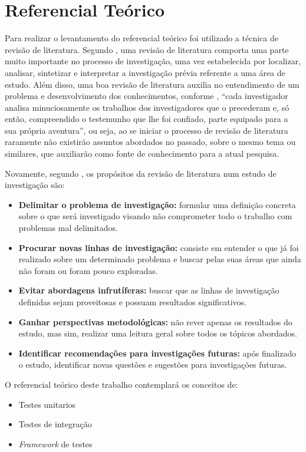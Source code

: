 \chapter{Referencial Teórico}
Para realizar o levantamento do referencial teórico foi utilizado a técnica de revisão de literatura.
Segundo , uma revisão de literatura comporta uma parte muito importante no processo de investigação, 
uma vez estabelecida por localizar, analisar, sintetizar e interpretar a investigação prévia referente a uma área de estudo. 
Além disso, uma boa revisão de literatura auxilia no entendimento de um problema e desenvolvimento dos conhecimentos, 
conforme , “cada investigador analisa minuciosamente os trabalhos dos investigadores 
que o precederam e, só então, compreendido o testemunho que lhe foi confiado, parte equipado para a sua própria aventura”, 
ou seja, ao se iniciar o processo de revisão de literatura raramente não existirão assuntos abordados no passado, sobre o 
mesmo tema ou similares, que auxiliarão como fonte de conhecimento para a atual pesquisa.

Novamente, segundo , os propósitos da revisão de literatura num estudo de investigação são:

\begin{itemize}
 
	\item \textbf{Delimitar o problema de investigação:} formular uma definição concreta sobre o que será investigado visando não comprometer todo o trabalho com problemas mal delimitados.
	\item \textbf{Procurar novas linhas de investigação:} consiste em entender o que já foi realizado sobre um determinado problema e buscar pelas suas áreas que ainda não foram ou foram pouco exploradas.
	\item \textbf{Evitar abordagens infrutíferas:} buscar que as linhas de investigação definidas sejam proveitosas e possuam resultados significativos.
	\item \textbf{Ganhar perspectivas metodológicas:} não rever apenas os resultados do estudo, mas sim, realizar uma leitura geral sobre todos os tópicos abordados.
	\item \textbf{Identificar recomendações para investigações futuras:} após finalizado o estudo, identificar novas questões e sugestões para investigações futuras.

\end{itemize}

O referencial teórico deste trabalho contemplará os conceitos de:

\begin{itemize}

	\item Testes unitarios
	\item Testes de integração
	\item \textit{Framework} de testes
	
\end{itemize}

